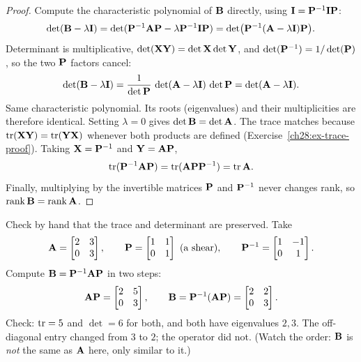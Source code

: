 \begin{proof}
Compute the characteristic polynomial of $\mathbf{B}$ directly, using
$\mathbf{I}=\mathbf{P}^{-1}\mathbf{I}\mathbf{P}$:
\[
\det(\mathbf{B}-\lambda\mathbf{I})
= \det(\mathbf{P}^{-1}\mathbf{A}\mathbf{P}-\lambda\mathbf{P}^{-1}\mathbf{I}\mathbf{P})
= \det\!\big(\mathbf{P}^{-1}(\mathbf{A}-\lambda\mathbf{I})\mathbf{P}\big).
\]
Determinant is multiplicative, $\det(\mathbf{X}\mathbf{Y})=\det\mathbf{X}\det\mathbf{Y}$, and
$\det(\mathbf{P}^{-1})=1/\det(\mathbf{P})$, so the two $\mathbf{P}$ factors cancel:
\[
\det(\mathbf{B}-\lambda\mathbf{I}) = \frac{1}{\det\mathbf{P}}\,\det(\mathbf{A}-\lambda\mathbf{I})\,\det\mathbf{P}
= \det(\mathbf{A}-\lambda\mathbf{I}).
\]
Same characteristic polynomial. Its roots (eigenvalues) and their multiplicities are
therefore identical. Setting $\lambda=0$ gives $\det\mathbf{B}=\det\mathbf{A}$. The trace
matches because $\operatorname{tr}(\mathbf{X}\mathbf{Y})=\operatorname{tr}(\mathbf{Y}\mathbf{X})$ whenever both products are
defined (Exercise~\ref{ch28:ex-trace-proof}). Taking $\mathbf{X}=\mathbf{P}^{-1}$ and
$\mathbf{Y}=\mathbf{A}\mathbf{P}$,
\[
\operatorname{tr}(\mathbf{P}^{-1}\mathbf{A}\mathbf{P})=\operatorname{tr}(\mathbf{A}\mathbf{P}\mathbf{P}^{-1})=\operatorname{tr}\mathbf{A}.
\]
Finally,
multiplying by the invertible matrices $\mathbf{P}$ and $\mathbf{P}^{-1}$ never changes rank, so
$\operatorname{rank}\mathbf{B}=\operatorname{rank}\mathbf{A}$.
\end{proof}

\begin{labbox}
Check by hand that the trace and determinant are preserved. Take
\[
\mathbf{A}=\begin{bmatrix}2&3\\0&3\end{bmatrix},\qquad
\mathbf{P}=\begin{bmatrix}1&1\\0&1\end{bmatrix}\ \text{(a shear)},\qquad
\mathbf{P}^{-1}=\begin{bmatrix}1&-1\\0&1\end{bmatrix}.
\]
Compute $\mathbf{B}=\mathbf{P}^{-1}\mathbf{A}\mathbf{P}$ in two steps:
\[
\mathbf{A}\mathbf{P}=\begin{bmatrix}2&5\\0&3\end{bmatrix},\qquad
\mathbf{B}=\mathbf{P}^{-1}(\mathbf{A}\mathbf{P})=\begin{bmatrix}2&2\\0&3\end{bmatrix}.
\]
Check: $\operatorname{tr}=5$ and $\det=6$ for both, and both have eigenvalues $2,3$. The off-diagonal
entry changed from $3$ to $2$; the operator did not. (Watch the order: $\mathbf{B}$ is
\emph{not} the same as $\mathbf{A}$ here, only similar to it.)
\end{labbox}

